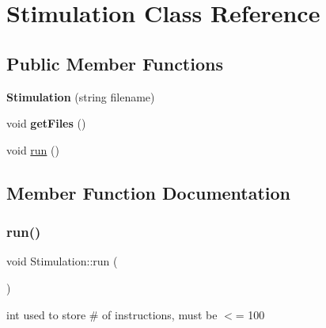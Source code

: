 \hypertarget{class_stimulation}{}\section{Stimulation Class Reference}
\label{class_stimulation}
\subsection*{Public Member Functions}
\begin{DoxyCompactItemize}
\item 
\mbox{\label{class_stimulation_ac4764d0a782545ea2eaea99889622a40}} 
{\bfseries Stimulation} (string filename)
\item 
\mbox{\label{class_stimulation_a99b9dbbbfbf5c74b8cfa67f54ba2a9d2}} 
void {\bfseries get\+Files} ()
\item 
void \mbox{\hyperlink{class_stimulation_a4a2d2160a53f20aa311c83823e148145}{run}} ()
\end{DoxyCompactItemize}


\subsection{Member Function Documentation}
\mbox{\label{class_stimulation_a4a2d2160a53f20aa311c83823e148145}} 
\subsubsection{\texorpdfstring{run()}{run()}}
{\footnotesize\ttfamily void Stimulation\+::run (\begin{DoxyParamCaption}{ }\end{DoxyParamCaption})}

int used to store \# of instructions, must be $<$= 100

